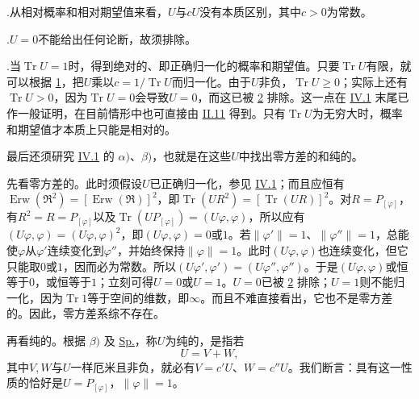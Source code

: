 \documentclass[fontsize=13pt,twoside,openany,headings=normal,parskip=false,bookmarkpackage=false,DIV=calc]{scrbook}
\begin{document}
\noindent{}.\label{remark:IV.2.1}从相对概率和相对期望值来看，$U$与$cU$没有本质区别，其中$c>0$为常数。

\hypertarget{origpage-169}{}\label{origpage-169}\noindent{}.\label{remark:IV.2.2}$U=0$不能给出任何论断，故须排除。

\noindent{}.\label{remark:IV.2.3}当$\operatorname{Tr}U=1$时，得到绝对的、即正确归一化的概率和期望值。只要$\operatorname{Tr}U$有限，就可以根据 \hyperref[remark:IV.2.1]{1}，把$U$乘以$c=1/\operatorname{Tr}U$而归一化。由于$U$非负，$\operatorname{Tr}U\geq0$；实际上还有$\operatorname{Tr}U>0$，因为$\operatorname{Tr}U=0$会导致$U=0$，而这已被 \hyperref[remark:IV.2.2]{2} 排除。这一点在 \hyperref[sec:IV.1]{IV.1} 末尾已作一般证明，在目前情形中也可直接由 \hyperref[sec:II.11]{II.11} 得到。只有$\operatorname{Tr}U$为无穷大时，概率和期望值才本质上只能是相对的。

最后还须研究 \hyperref[sec:IV.1]{IV.1} 的 \hyperref[def:IV.1.alpha]{$\alpha)$}、\hyperref[def:IV.1.beta]{$\beta)$}，也就是在这些$U$中找出零方差的和纯的。

先看零方差的。此时须假设$U$已正确归一化，参见 \hyperref[sec:IV.1]{IV.1}；而且应恒有$\operatorname{Erw}(\mathfrak R^2)=[\operatorname{Erw}(\mathfrak R)]^2$，即$\operatorname{Tr}(UR^2)=[\operatorname{Tr}(UR)]^2$。对$R=P_{[\varphi]}$，有$R^2=R=P_{[\varphi]}$以及$\operatorname{Tr}(UP_{[\varphi]})=(U\varphi,\allowbreak \varphi)$，所以应有$(U\varphi,\allowbreak \varphi)=(U\varphi,\allowbreak \varphi)^2$，即$(U\varphi,\allowbreak \varphi)=0$或$1$。若$\|\varphi'\|=1$、$\|\varphi''\|=1$，总能使$\varphi$从$\varphi'$连续变化到$\varphi''$，并始终保持$\|\varphi\|=1$。此时$(U\varphi,\allowbreak \varphi)$也连续变化，但它只能取$0$或$1$，因而必为常数。所以$(U\varphi',\allowbreak \varphi')=(U\varphi'',\allowbreak \varphi'')$。于是$(U\varphi,\allowbreak \varphi)$或恒等于$0$，或恒等于$1$；立刻可得$U=0$或$U=1$。$U=0$已被 \hyperref[remark:IV.2.2]{2} 排除；$U=1$则不能归一化，因为$\operatorname{Tr}1$等于空间的维数，即$\infty$。而且不难直接看出，它也不是零方差的。因此，零方差系综不存在。

再看纯的。根据 \hyperref[def:IV.1.beta]{$\beta)$} 及 \hyperref[eq:IV.2.Sp]{Sp.}，称$U$为纯的，是指若
\[
U=V+W,
\]
其中$V,\allowbreak W$与$U$一样厄米且非负，就必有$V=c'U$、$W=c''U$。我们断言：具有这一性质的恰好是$U=P_{[\varphi]}$，$\|\varphi\|=1$。
\end{document}
